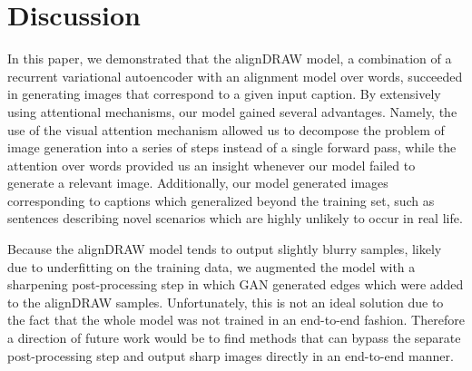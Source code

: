 \documentclass{article} %
\begin{document}
\section{Discussion}

In this paper, we demonstrated that the alignDRAW model, a combination of a recurrent variational autoencoder with an alignment model over words, succeeded in generating images that correspond to a given input caption. By extensively using attentional mechanisms, our model gained several advantages. Namely, the use of the visual attention mechanism allowed us to decompose the problem of image generation into a series of steps instead of a single forward pass, while the attention over words provided us an insight whenever our model failed to generate a relevant image. Additionally, our model generated images corresponding to captions which generalized beyond the training set, such as sentences describing novel scenarios which are highly unlikely to occur in real life.

Because the alignDRAW model tends to output slightly blurry samples, likely due to underfitting on the training data, we augmented the model with a sharpening post-processing step in which GAN generated edges which were added to the alignDRAW samples. Unfortunately, this is not an ideal solution due to the fact that the whole model was not trained in an end-to-end fashion. Therefore a direction of future work would be to find methods that can bypass the separate post-processing step and output sharp images directly in an end-to-end manner. 

\end{document}
